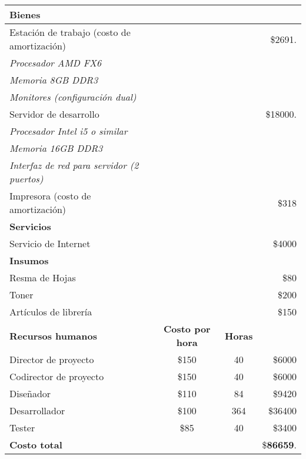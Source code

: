 \begin{center}

	\begin{tabular}{l c c r}
		\hline \hline
		
		\textbf{Bienes} & & & \\ \hline
		Estación de trabajo (costo de amortización)& & & \$2691. \\
		\textit{Procesador AMD FX6} & & &\\
		\textit{Memoria 8GB DDR3} & & & \\
		\textit{Monitores (configuración dual)} & & & \\
		\hline
		Servidor de desarrollo & & & \$18000. \\
		\textit{Procesador Intel i5 o similar} & & & \\
		\textit{Memoria 16GB DDR3} & & & \\
		\textit{Interfaz de red para servidor (2 puertos)} & & & \\
		\hline
		Impresora (costo de amortización) & & & \$318 \\
		\hline \hline
		
		\textbf{Servicios} & & &\\ \hline
		Servicio de Internet & & & \$4000 \\
		\hline \hline
		\textbf{Insumos} & & &\\ \hline
		Resma de Hojas & & & \$80 \\
		Toner & & & \$200 \\
		Artículos de librería & & & \$150 \\
		\hline \hline
		\textbf{Recursos humanos} & \textbf{Costo por hora} & \textbf{Horas} \\
		Director de proyecto & \$150 & 40 & \$6000 \\
		Codirector de proyecto & \$150 & 40 & \$6000 \\
		Diseñador & \$110 & 84 & \$9420 \\
		Desarrollador & \$100 & 364 & \$36400 \\
		Tester & \$85 & 40 & \$3400 \\
		\hline \hline
		\textbf{Costo total} & & & \$\textbf{86659}.
	\end{tabular}
\end{center}



